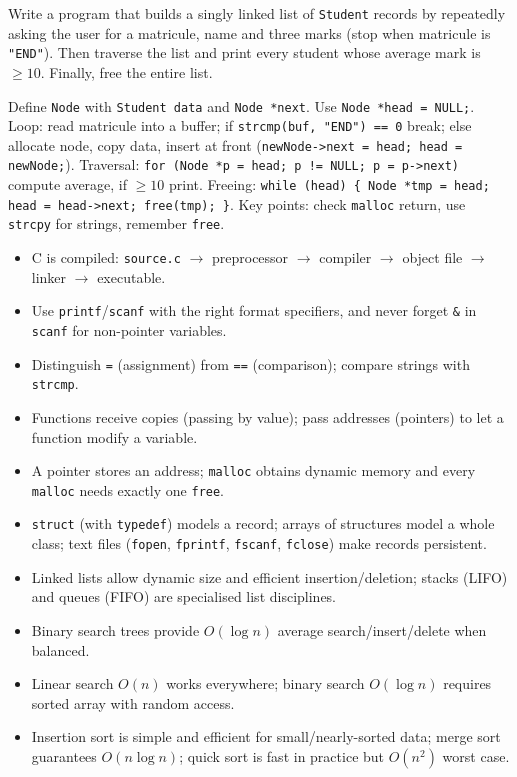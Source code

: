 \documentclass[11pt]{article}
\begin{document}
\begin{exercice}
Write a program that builds a singly linked list of \texttt{Student} records by repeatedly asking the user for a matricule, name and three marks (stop when matricule is \texttt{"END"}). Then traverse the list and print every student whose average mark is $\ge 10$. Finally, free the entire list.
\end{exercice}

\begin{corrige}[Exercise 2]
Define \texttt{Node} with \texttt{Student data} and \texttt{Node *next}. Use \texttt{Node *head = NULL;}. Loop: read matricule into a buffer; if \texttt{strcmp(buf, "END") == 0} break; else allocate node, copy data, insert at front (\texttt{newNode->next = head; head = newNode;}). Traversal: \texttt{for (Node *p = head; p != NULL; p = p->next)} compute average, if $\ge 10$ print. Freeing: \texttt{while (head) \{ Node *tmp = head; head = head->next; free(tmp); \}}. Key points: check \texttt{malloc} return, use \texttt{strcpy} for strings, remember \texttt{free}.
\end{corrige}

\begin{aretenir}
\begin{itemize}
\item C is compiled: \texttt{source.c} $\rightarrow$ preprocessor $\rightarrow$ compiler $\rightarrow$ object file $\rightarrow$ linker $\rightarrow$ executable.
\item Use \texttt{printf}/\texttt{scanf} with the right format specifiers, and never forget \texttt{\&} in \texttt{scanf} for non-pointer variables.
\item Distinguish \texttt{=} (assignment) from \texttt{==} (comparison); compare strings with \texttt{strcmp}.
\item Functions receive copies (passing by value); pass addresses (pointers) to let a function modify a variable.
\item A pointer stores an address; \texttt{malloc} obtains dynamic memory and every \texttt{malloc} needs exactly one \texttt{free}.
\item \texttt{struct} (with \texttt{typedef}) models a record; arrays of structures model a whole class; text files (\texttt{fopen}, \texttt{fprintf}, \texttt{fscanf}, \texttt{fclose}) make records persistent.
\item Linked lists allow dynamic size and efficient insertion/deletion; stacks (LIFO) and queues (FIFO) are specialised list disciplines.
\item Binary search trees provide $O(\log n)$ average search/insert/delete when balanced.
\item Linear search $O(n)$ works everywhere; binary search $O(\log n)$ requires sorted array with random access.
\item Insertion sort is simple and efficient for small/nearly-sorted data; merge sort guarantees $O(n \log n)$; quick sort is fast in practice but $O(n^2)$ worst case.
\end{itemize}
\end{aretenir}
\end{document}
